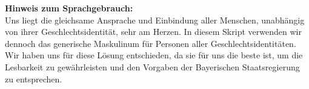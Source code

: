 \documentclass[11pt,a4paper]{book}
\begin{document}
\lipsum[2]

\vfill
\textbf{Hinweis zum Sprachgebrauch:} \\
Uns liegt die gleichsame Ansprache und Einbindung aller Menschen, unabhängig von ihrer Geschlechtsidentität, sehr am Herzen. In diesem Skript verwenden wir dennoch das generische Maskulinum für Personen aller Geschlechtsidentitäten. Wir haben uns für diese Lösung entschieden, da sie für uns die beste ist, um die Lesbarkeit zu gewährleisten und den Vorgaben der Bayerischen Staatsregierung zu entsprechen.



\tableofcontents
\newpage

\restoregeometry %






\printbibliography


\end{document}
